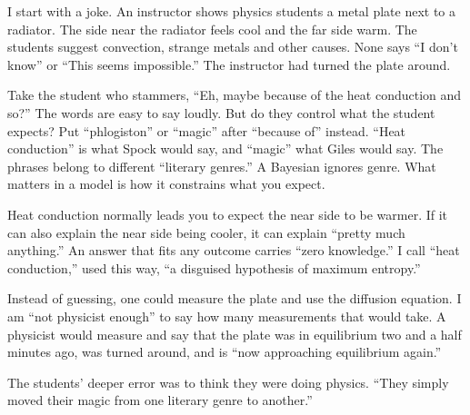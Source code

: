 
I start with a joke. An instructor shows physics students a metal plate next to a radiator. The side near the radiator feels cool and the far side warm. The students suggest convection, strange metals and other causes. None says ``I don't know'' or ``This seems impossible.'' The instructor had turned the plate around.

Take the student who stammers, ``Eh, maybe because of the heat conduction and so?'' The words are easy to say loudly. But do they control what the student expects? Put ``phlogiston'' or ``magic'' after ``because of'' instead. ``Heat conduction'' is what Spock would say, and ``magic'' what Giles would say. The phrases belong to different ``literary genres.'' A Bayesian ignores genre. What matters in a model is how it constrains what you expect. 

Heat conduction normally leads you to expect the near side to be warmer. If it can also explain the near side being cooler, it can explain ``pretty much anything.''  An answer that fits any outcome carries ``zero knowledge.'' I call ``heat conduction,'' used this way, ``a disguised hypothesis of maximum entropy.'' 

Instead of guessing, one could measure the plate and use the diffusion equation. I am ``not physicist enough'' to say how many measurements that would take. A physicist would measure and say that the plate was in equilibrium two and a half minutes ago, was turned around, and is ``now approaching equilibrium again.''

The students' deeper error was to think they were doing physics. ``They simply moved their magic from one literary genre to another.''
